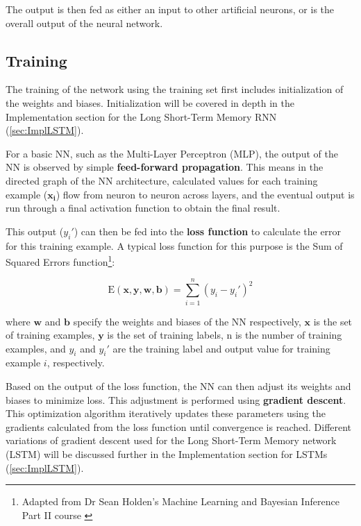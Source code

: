 \documentclass[12pt,a4paper,twoside,openright]{report}
\renewcommand{\vec}[1]{\mathbf{#1}}
\begin{document}
The output is then fed as either an input to other artificial neurons, or is the overall
output of the neural network.

\subsection{Training}
\label{sec:introTraining}

The training of the network using the training set first includes initialization of the 
weights and biases. Initialization will be covered in depth in the Implementation section
for the Long Short-Term Memory RNN (\cref{sec:ImplLSTM}).

For a basic NN, such as the Multi-Layer Perceptron (MLP), the output of the NN is
observed by simple \textbf{feed-forward propagation}. This means in the directed graph
of the NN architecture, calculated values for each training example ($\vec{x_i}$)
flow from neuron to neuron across layers, and the eventual
output is run through a final activation function to obtain the final result.

This output ($y_i'$) can then be fed into the \textbf{loss function} to calculate the error for this
training example. A typical loss function for this purpose is the Sum of Squared Errors 
function\footnote{Adapted from Dr Sean Holden's Machine Learning and Bayesian Inference Part II course \cite{Holden18}}:

\begin{equation}
\text{E}(\vec{x}, \vec{y}, \vec{w}, \vec{b})  = \sum_{i=1}^{n} (y_i - y_i')^2
\end{equation}

where $\vec{w}$ and $\vec{b}$ specify the weights and biases of the NN respectively, 
$\vec{x}$ is the set of training examples,
$\vec{y}$ is the set of training labels, n is the number of training examples, and $y_i$ and $y_i'$
are the training label and output value for training example $i$, respectively.

Based on the output of the loss function, the NN can then adjust its weights and biases to minimize
loss. This adjustment is performed using \textbf{gradient descent}. This optimization algorithm
iteratively updates these parameters using the gradients calculated from the loss function until
convergence is reached. Different variations of gradient descent used for the Long Short-Term Memory 
network (LSTM) will be discussed further in the Implementation section for LSTMs
(\cref{sec:ImplLSTM}).
\end{document}
